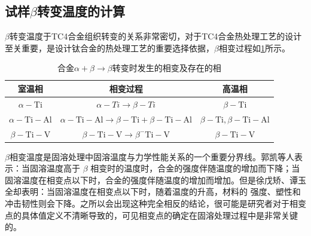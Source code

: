 %

\subsection{试样$\beta$转变温度的计算}
$\beta$转变温度于TC4合金组织转变的关系非常密切，对于TC4合金热处理工艺的设计至关重要，是设计钛合金的热处理工艺的重要选择依据，$ \beta $相变过程如\ref{sec:Tc4betachange}所示。

\begin{table}[htbp]
	\centering
	\caption{\ti 合金$ \alpha+\beta \to \beta $转变时发生的相变及存在的相}
	\label{sec:Tc4betachange}
	\begin{tabular}{ccc}
		\toprule 室温相 & 相变过程 & 高温相 \\
		\midrule$\alpha-\mathrm{Ti}$ & $\alpha-T i \rightarrow \beta-T i$ & $\beta-\mathrm{Ti}$ \\
		$\alpha-\mathrm{Ti}-\mathrm{Al}$ & $\alpha-\mathrm{Ti}-\mathrm{Al} \rightarrow \beta-\mathrm{Ti}+\beta-\mathrm{Ti}-\mathrm{Al}$ & $\beta-\mathrm{Ti}, \beta-\mathrm{Ti}-\mathrm{Al}$ \\
		$\beta- \mathrm{Ti}-\mathrm{V}$ & $\beta-\mathrm{Ti}-\mathrm{V} \rightarrow \beta^{-} \mathrm{Ti}-\mathrm{V}$ & $\beta-\mathrm{Ti}-\mathrm{V}$ \\
		\bottomrule
	\end{tabular}
\end{table}

$ \beta $相变温度是固溶处理中固溶温度与力学性能关系的一个重要分界线。郭凯\cite{guokaiTC4taihejinrechuligongyideyanjiuxianzhuangjijinzhan2021}等人表示：当固溶温度高于 $\beta$ 相变时的温度时，合金的强度伴随温度的增加而下降；当固溶温度在相变点以下时，合金的强度伴随温度的增加而增加。但是徐戊矫、谭玉全\cite{xujianGurongshixiaogongyiduiTC4taihejinzuzhijixingnengdeyingxiang2014}却表明：当固溶温度在相变点以下时，随着温度的升高，材料的 强度、塑性和冲击韧性则会下降。之所以会出现这种完全相反的结论，很可能是研究者对于相变点的具体值定义不清晰导致的，可见相变点的确定在固溶处理过程中是非常关键的。


